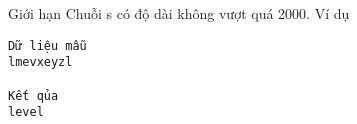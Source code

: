 Giới hạn
Chuỗi s có độ dài không vượt quá 2000.
Ví dụ
\begin{verbatim}
Dữ liệu mẫu
lmevxeyzl

Kết qủa
level
\end{verbatim}